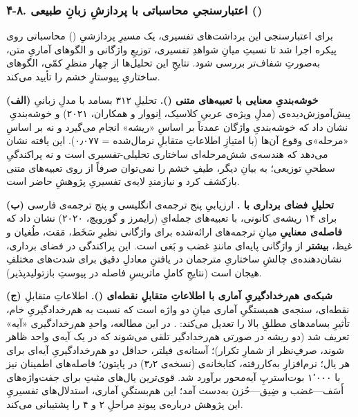 \begin{RTL}
\begin{otherlanguage}{persian}
\subsubsection{\texorpdfstring{۴-۸. اعتبارسنجیِ محاسباتی با پردازشِ زبانِ
طبیعی
()}{۴-۸. اعتبارسنجیِ محاسباتی با پردازشِ زبانِ طبیعی ()}}\label{ux627ux639ux62aux628ux627ux631ux633ux646ux62cux6cc-ux645ux62dux627ux633ux628ux627ux62aux6cc-ux628ux627-ux67eux631ux62fux627ux632ux634-ux632ux628ux627ux646-ux637ux628ux6ccux639ux6cc}

برای اعتبارسنجی این برداشت‌های تفسیری، یک مسیرِ پردازشیِ ()
محاسباتی روی پیکره اجرا شد تا نسبتِ میانِ شواهدِ تفسیری، توزیعِ واژگانی و
الگوهای آماریِ متن، به‌صورتِ شفاف‌تر بررسی شود. نتایجِ این تحلیل‌ها از چهار
منظرِ کمّی، الگوهای ساختاریِ پیوستارِ خشم را تأیید می‌کند.

\textbf{(الف) خوشه‌بندیِ معنایی با تعبیه‌های متنی ().}
تحلیلِ ۳۱۲ بسامد با مدلِ زبانیِ پیش‌آموزش‌دیده‌ی  (مدلِ
 ویژه‌ی عربیِ کلاسیک، اِنووار و همکاران، ۲۰۲۱) و خوشه‌بندیِ
‌ نشان داد که خوشه‌بندیِ واژگان عمدتاً بر اساسِ «ریشه» انجام
می‌گیرد و نه بر اساسِ «مرحله»‌ی وقوع آن‌ها (با امتیازِ اطلاعاتِ متقابلِ
نرمال‌شده  = ۰٫۰۷۷). این یافته نشان می‌دهد که هندسه‌ی شش‌مرحله‌ای
ساختاری تحلیلی-تفسیری است و نه پراکندگیِ سطحیِ توزیعی؛ به بیانِ دیگر، طیفِ
خشم را نمی‌توان صرفاً از روی تعبیه‌های متنی بازکشف کرد و نیازمندِ لایه‌ی
تفسیریِ پژوهشِ حاضر است.

\textbf{(ب) تحلیلِ فضای برداری با .} ارزیابیِ پنج ترجمه‌ی انگلیسی
و پنج ترجمه‌ی فارسی برای ۱۴ ریشه‌ی کانونی، با تعبیه‌های جمله‌ایِ
 (رایمرز و گورویچ، ۲۰۲۰) نشان
داد که \textbf{فاصله‌ی معناییِ} میانِ ترجمه‌های ارائه‌شده برای واژگانی نظیرِ
سَخَط، مَقت، طُغیان و غیظ، \textbf{بیشتر} از واژگانی پایه‌ای مانندِ غضب و بَغی
است. این پراکندگی در فضای برداری، نشان‌دهنده‌ی چالشِ ساختاریِ مترجمان در
یافتنِ معادلِ دقیق برای شدت‌های مختلفِ هیجان است (نتایجِ کاملِ ماتریسِ فاصله در
پیوستِ بازتولیدپذیر).

\textbf{(ج) شبکه‌ی هم‌رخدادگیریِ آماری با اطلاعاتِ متقابلِ نقطه‌ای
().} اطلاعاتِ متقابلِ نقطه‌ای، سنجه‌ی همبستگیِ آماری میانِ دو واژه است
که نسبت به هم‌رخدادگیریِ خام، تأثیرِ بسامدهای مطلقِ بالا را تعدیل می‌کند:
. در این مطالعه، واحدِ
هم‌رخدادگیری «آیه» تعریف شد (دو ریشه در صورتی هم‌رخدادگیر تلقی می‌شوند که
در یک آیه‌ی واحد ظاهر شوند، صرفِ‌نظر از شمارِ تکرار)؛ آستانه‌ی فیلتر، حداقل
دو هم‌رخدادگیریِ آیه‌ای برای هر یال؛ نرم‌افزارِ به‌کاررفته، کتابخانه‌ی
 (نسخه‌ی ۳٫۲) در پایتون؛ فاصله‌های اطمینان نیز با ۱٬۰۰۰
بوت‌استرپِ آیه‌محور برآورد شد. قوی‌ترین یال‌های مثبتِ  برای جفت‌واژه‌های
أَسَف---غضب و ضِیق---حُزن به‌دست آمد؛ این هم‌بستگیِ آماری، استدلال‌های تفسیریِ
این پژوهش درباره‌ی پیوندِ مراحلِ ۲ و ۴ را پشتیبانی می‌کند.


\end{otherlanguage}
\end{RTL}

